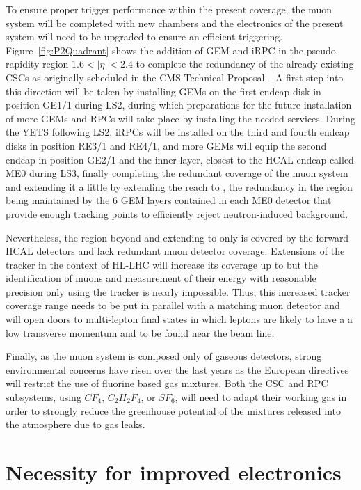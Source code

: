 To ensure proper trigger performance within the present coverage, the muon system will be completed with new chambers and the electronics of the present system will need to be upgraded to ensure an efficient triggering. Figure~\ref{fig:P2Quadrant} shows the addition of \acf{GEM} and \acf{iRPC} in the pseudo-rapidity region $1.6<\vert\eta\vert<2.4$ to complete the redundancy of the already existing CSCs as originally scheduled in the CMS Technical Proposal~\cite{CMSTP}. A first step into this direction will be taken by installing GEMs on the first endcap disk in position GE1/1 during LS2, during which preparations for the future installation of more GEMs and RPCs will take place by installing the needed services. During the YETS following LS2, iRPCs will be installed on the third and fourth endcap disks in position RE3/1 and RE4/1, and more GEMs will equip the second endcap in position GE2/1 and the inner layer, closest to the HCAL endcap called ME0 during LS3, finally completing the redundant coverage of the muon system and extending it a little by extending the reach to , the redundancy in the region  being maintained by the 6 GEM layers contained in each ME0 detector that provide enough tracking points to efficiently reject neutron-induced background.
	
	Nevertheless, the region beyond  and extending to  only is covered by the forward HCAL detectors and lack redundant muon detector coverage. Extensions of the tracker in the context of HL-LHC will increase its coverage up to  but the identification of muons and measurement of their energy with reasonable precision only using the tracker is nearly impossible. Thus, this increased tracker coverage range needs to be put in parallel with a matching muon detector and will open doors to multi-lepton final states in which leptons are likely to have a a low transverse momentum and to be found near the beam line.
	
	Finally, as the muon system is composed only of gaseous detectors, strong environmental concerns have risen over the last years as the European directives will restrict the use of fluorine based gas mixtures. Both the CSC and RPC subsystems, using $CF_4$, $C_2H_2F_4$, or $SF_6$, will need to adapt their working gas in order to strongly reduce the greenhouse potential of the mixtures released into the atmosphere due to gas leaks.
	
\section{Necessity for improved electronics}
\label{chapt3:sec:electronics}

